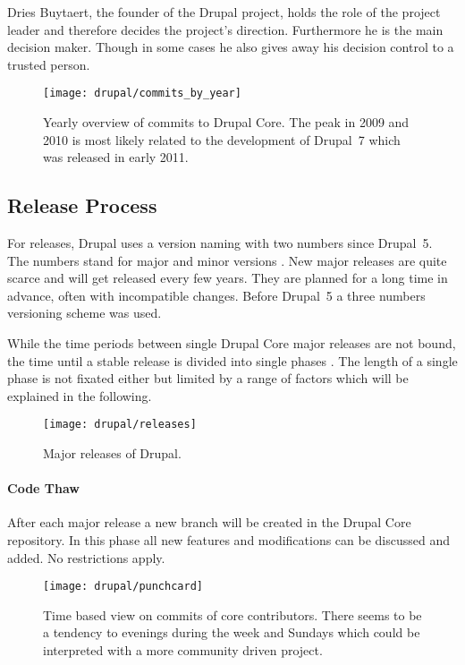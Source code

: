 Dries Buytaert, the founder of the Drupal project, holds the role of the
project leader and therefore decides the project's direction. Furthermore he is
the main decision maker. Though in some cases he also gives away his decision
control to a trusted person.

\begin{figure}[htbp]
  \centering
  \texttt{[image: drupal/commits\_by\_year]}
  \caption[Commits by Year, Drupal]
  {Yearly overview of commits to Drupal Core. The peak in 2009 and 2010 is most
    likely related to the development of Drupal~7 which was released in early
    2011.}
\end{figure}


\subsection{Release Process} %

For releases, Drupal uses a version naming with two numbers since Drupal~5. The
numbers stand for major and minor versions \cite{DrupalUpgrade}. New major
releases are quite scarce and will get released every few years. They are
planned for a long time in advance, often with incompatible changes. Before
Drupal~5 a three numbers versioning scheme was used.

While the time periods between single Drupal Core major releases are not bound,
the time until a stable release is divided into single phases
\cite{DrupalReleaseCycle}. The length of a single phase is not fixated either
but limited by a range of factors which will be explained in the following.

\begin{figure}[htbp]
  \centering
  \texttt{[image: drupal/releases]}
  \caption[Major Releases of Drupal]{Major releases of Drupal.}
\end{figure}

\paragraph{Code Thaw}

After each major release a new branch will be created in the Drupal Core
repository. In this phase all new features and modifications can be discussed
and added. No restrictions apply.

\begin{figure}[htbp]
  \centering
  \texttt{[image: drupal/punchcard]}
  \caption[Time Based View on Commits, Drupal]
  {Time based view on commits of core contributors. There seems to be a
    tendency to evenings during the week and Sundays which could be interpreted
    with a more community driven project.}
\end{figure}

